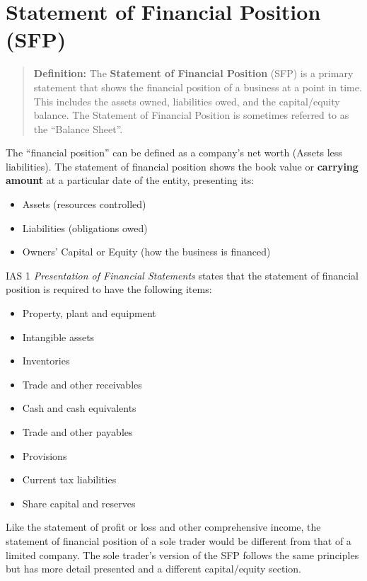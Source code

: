 
\newpage

\section{Statement of Financial Position (SFP)}

\begin{quote}
\textbf{Definition:} The \textbf{Statement of Financial Position} (SFP) is a primary statement that shows the financial position of a business at a point in time. This includes the assets owned, liabilities owed, and the capital/equity balance. The Statement of Financial Position is sometimes referred to as the ``Balance Sheet''.
\end{quote}

The ``financial position'' can be defined as a company's net worth (Assets less liabilities). The statement of financial position shows the book value or \textbf{carrying amount} at a particular date of the entity, presenting its:
\begin{itemize}
    \item Assets (resources controlled)
    \item Liabilities (obligations owed)
    \item Owners' Capital or Equity (how the business is financed)
\end{itemize}

IAS 1 \textit{Presentation of Financial Statements} states that the statement of financial position is required to have the following items:
\begin{itemize}
    \item Property, plant and equipment
    \item Intangible assets
    \item Inventories
    \item Trade and other receivables
    \item Cash and cash equivalents
    \item Trade and other payables
    \item Provisions
    \item Current tax liabilities
    \item Share capital and reserves
\end{itemize}

Like the statement of profit or loss and other comprehensive income, the statement of financial position of a sole trader would be different from that of a limited company. The sole trader's version of the SFP follows the same principles but has more detail presented and a different capital/equity section.

